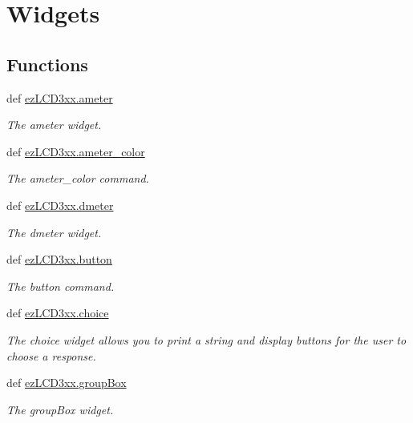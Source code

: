 \hypertarget{group___widgets}{\section{Widgets}
\label{group___widgets}
}
\subsection*{Functions}
\begin{DoxyCompactItemize}
\item 
def \hyperlink{group___widgets_ga01020dc360dfbd9f463bf5478e42566e}{ez\-L\-C\-D3xx.\-ameter}
\begin{DoxyCompactList}\small\item\em The ameter widget. \end{DoxyCompactList}\item 
def \hyperlink{group___widgets_ga87633e350f72285b45b9df28eff6ba18}{ez\-L\-C\-D3xx.\-ameter\-\_\-color}
\begin{DoxyCompactList}\small\item\em The ameter\-\_\-color command. \end{DoxyCompactList}\item 
def \hyperlink{group___widgets_gaa521dbc7f8860a624135caaa58ba516d}{ez\-L\-C\-D3xx.\-dmeter}
\begin{DoxyCompactList}\small\item\em The dmeter widget. \end{DoxyCompactList}\item 
def \hyperlink{group___widgets_ga7eeeb3ce522c7891c3f76cdc79f11192}{ez\-L\-C\-D3xx.\-button}
\begin{DoxyCompactList}\small\item\em The button command. \end{DoxyCompactList}\item 
def \hyperlink{group___widgets_gad1b05a5ee17690c241c30b6a15437c8b}{ez\-L\-C\-D3xx.\-choice}
\begin{DoxyCompactList}\small\item\em The choice widget allows you to print a string and display buttons for the user to choose a response. \end{DoxyCompactList}\item 
def \hyperlink{group___widgets_ga794dde0f8237dcfcd90646e0eeb2ca65}{ez\-L\-C\-D3xx.\-group\-Box}
\begin{DoxyCompactList}\small\item\em The group\-Box widget. \end{DoxyCompactList}\item 

\end{DoxyCompactItemize}
